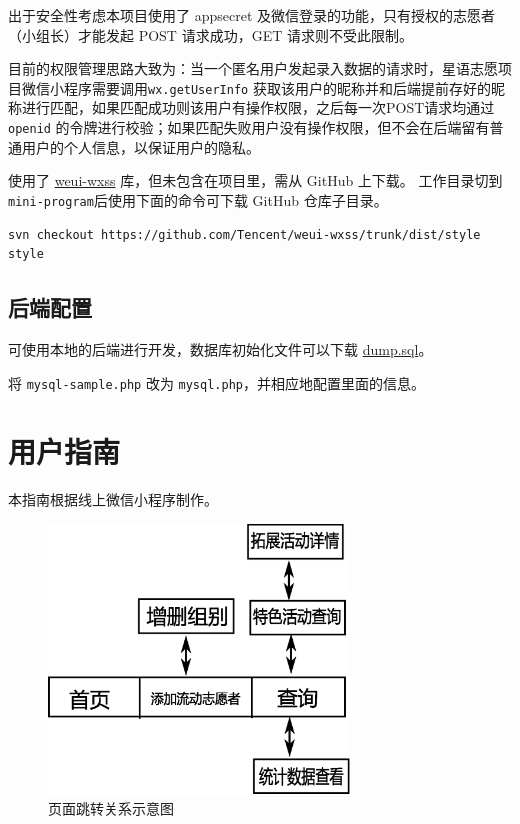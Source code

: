 \documentclass[]{ctexart}
\begin{document}
出于安全性考虑本项目使用了 appsecret
及微信登录的功能，只有授权的志愿者（小组长）才能发起 POST 请求成功，GET
请求则不受此限制。

目前的权限管理思路大致为：当一个匿名用户发起录入数据的请求时，星语志愿项目微信小程序需要调用\texttt{wx.getUserInfo}
获取该用户的昵称并和后端提前存好的昵称进行匹配，如果匹配成功则该用户有操作权限，之后每一次POST请求均通过
\texttt{openid}
的令牌进行校验；如果匹配失败用户没有操作权限，但不会在后端留有普通用户的个人信息，以保证用户的隐私。

使用了 \href{https://github.com/Tencent/weui-wxss}{weui-wxss}
库，但未包含在项目里，需从 GitHub 上下载。 工作目录切到
\texttt{mini-program}后使用下面的命令可下载 GitHub 仓库子目录。

\begin{lstlisting}[breaklines=true]
svn checkout https://github.com/Tencent/weui-wxss/trunk/dist/style style
\end{lstlisting}



\subsection{后端配置}\label{ux540eux7aefux914dux7f6e}

可使用本地的后端进行开发，数据库初始化文件可以下载
\href{https://www.leidenschaft.cn/xingyu/mysql_dump.sql}{dump.sql}。

将 \texttt{mysql-sample.php} 改为
\texttt{mysql.php}，并相应地配置里面的信息。

\section{用户指南}
本指南根据线上微信小程序制作。
\begin{figure}[!ht]
\centering
\includegraphics[width=8cm]{pages.eps}
\caption{页面跳转关系示意图}\label{jump}
\end{figure}
\end{document}
